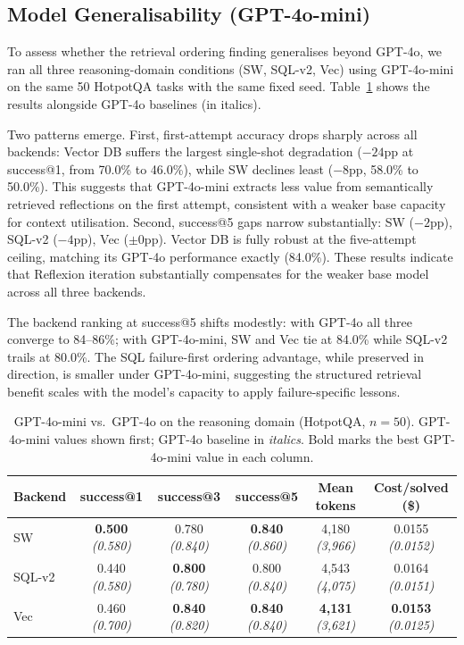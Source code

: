\documentclass{article}
\begin{document}
\subsection{Model Generalisability (GPT-4o-mini)}
\label{sec:miniresults}

To assess whether the retrieval ordering finding generalises beyond GPT-4o,
we ran all three reasoning-domain conditions (SW, SQL-v2, Vec) using
GPT-4o-mini on the same 50 HotpotQA tasks with the same fixed seed.
Table~\ref{tab:mini} shows the results alongside GPT-4o baselines (in
italics).

Two patterns emerge. First, first-attempt accuracy drops sharply across
all backends: Vector DB suffers the largest single-shot degradation
($-24$pp at success@1, from 70.0\% to 46.0\%), while SW declines least
($-8$pp, 58.0\% to 50.0\%). This suggests that GPT-4o-mini extracts less
value from semantically retrieved reflections on the first attempt,
consistent with a weaker base capacity for context utilisation. Second,
success@5 gaps narrow substantially: SW ($-2$pp), SQL-v2 ($-4$pp), Vec
($\pm 0$pp). Vector DB is fully robust at the five-attempt ceiling,
matching its GPT-4o performance exactly (84.0\%). These results indicate
that Reflexion iteration substantially compensates for the weaker base
model across all three backends.

The backend ranking at success@5 shifts modestly: with GPT-4o all three
converge to 84--86\%; with GPT-4o-mini, SW and Vec tie at 84.0\% while
SQL-v2 trails at 80.0\%. The SQL failure-first ordering advantage, while
preserved in direction, is smaller under GPT-4o-mini, suggesting the
structured retrieval benefit scales with the model's capacity to apply
failure-specific lessons.

\begin{table}[h]
\centering
\caption{
  GPT-4o-mini vs.\ GPT-4o on the reasoning domain (HotpotQA, $n{=}50$).
  GPT-4o-mini values shown first; GPT-4o baseline in \textit{italics}.
  Bold marks the best GPT-4o-mini value in each column.
}
\label{tab:mini}
\small
\begin{tabular}{lccccc}
\toprule
Backend & success@1 & success@3 & success@5
  & Mean tokens & Cost/solved (\$) \\
\midrule
SW
  & \textbf{0.500} \textit{(0.580)}
  & 0.780 \textit{(0.840)}
  & \textbf{0.840} \textit{(0.860)}
  & 4{,}180 \textit{(3{,}966)}
  & 0.0155 \textit{(0.0152)} \\
SQL-v2
  & 0.440 \textit{(0.580)}
  & \textbf{0.800} \textit{(0.780)}
  & 0.800 \textit{(0.840)}
  & 4{,}543 \textit{(4{,}075)}
  & 0.0164 \textit{(0.0151)} \\
Vec
  & 0.460 \textit{(0.700)}
  & \textbf{0.840} \textit{(0.820)}
  & \textbf{0.840} \textit{(0.840)}
  & \textbf{4{,}131} \textit{(3{,}621)}
  & \textbf{0.0153} \textit{(0.0125)} \\
\bottomrule
\end{tabular}
\end{table}
\end{document}
